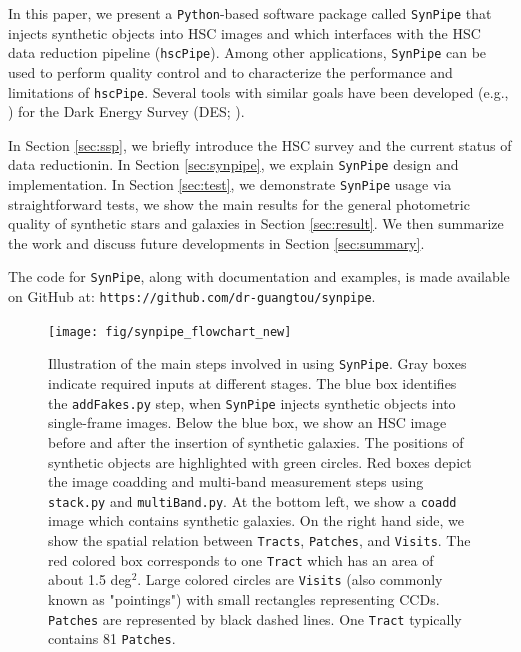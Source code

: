 \documentclass[useamsfonts]{pasj01}
\def\hscpipe{\texttt{hscPipe}}
\def\synpipe{\texttt{SynPipe}}
\def\coadd{\texttt{coadd}}
\begin{document}
    In this paper, we present a \texttt{Python}-based software package called 
    \synpipe{} that injects synthetic objects into HSC images and which interfaces with 
    the HSC data reduction pipeline (\hscpipe{}). 
    Among other applications, \synpipe{} can be used to perform quality control and 
    to characterize the performance and limitations of \hscpipe{}. 
    Several tools with similar goals have been developed (e.g., \citealt{Chang2015,
    Suchyta2016}) for the Dark Energy Survey (DES; \citealt{DES2005}).

    In Section \ref{sec:ssp}, we briefly introduce the HSC survey and the current status
    of data reductionin. 
    In Section \ref{sec:synpipe}, we explain \synpipe{} design and implementation.
    In Section \ref{sec:test}, we demonstrate \synpipe{} usage via straightforward
    tests, we show the main results for the general photometric quality of synthetic 
    stars and galaxies in Section \ref{sec:result}.
    We then summarize the work and discuss future developments in Section 
    \ref{sec:summary}.

    The code for \synpipe{}, along with documentation and examples, is made available
    on GitHub at: \texttt{https://github.com/dr-guangtou/synpipe}.
    

\begin{figure}
    \begin{center}
        \texttt{[image: fig/synpipe\_flowchart\_new]}
    \end{center}
    \caption{
        Illustration of the main steps involved in using \synpipe{}.
        Gray boxes indicate required inputs at different stages.
        The blue box identifies the \texttt{addFakes.py} step, when \synpipe{} injects 
        synthetic objects into single-frame images. 
        Below the blue box, we show an HSC image before and after the insertion of 
        synthetic galaxies. 
        The positions of synthetic objects are highlighted with green circles. 
        Red boxes depict the image coadding and multi-band measurement steps
        using \texttt{stack.py} and \texttt{multiBand.py}. 
        At the bottom left, we show a \coadd{} image which contains synthetic galaxies. 
        On the right hand side, we show the spatial relation between \texttt{Tracts},
        \texttt{Patches}, and \texttt{Visits}. 
        The red colored box corresponds to one \texttt{Tract} which has an area of 
        about 1.5 deg$^2$. 
        Large colored circles are \texttt{Visits} (also commonly known as "pointings") 
        with small rectangles representing CCDs. 
        \texttt{Patches} are represented by black dashed lines. 
        One \texttt{Tract} typically contains 81 \texttt{Patches}.
        }
    \label{fig:flowchart}
\end{figure}
\end{document}
